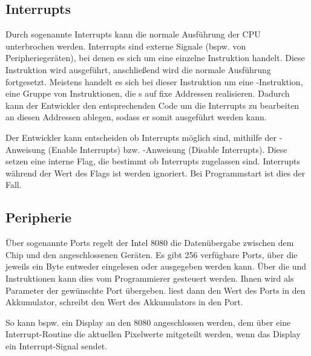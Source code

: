 \subsection{Interrupts}

Durch sogenannte Interrupts kann die normale Ausführung der CPU unterbrochen werden. Interrupts sind externe Signale (bspw. von Peripheriegeräten), bei denen es sich um eine einzelne Instruktion handelt. Diese Instruktion wird ausgeführt, anschließend wird die normale Ausführung fortgesetzt. Meistens handelt es sich bei dieser Instruktion um eine -Instruktion, eine Gruppe von Instruktionen, die s auf fixe Addressen realisieren. Dadurch kann der Entwickler den entsprechenden Code um die Interrupts zu bearbeiten an diesen Addressen ablegen, sodass er somit ausgeführt werden kann.

Der Entwickler kann entscheiden ob Interrupts möglich sind, mithilfe der -Anweisung (Enable Interrupts) bzw. -Anweisung (Disable Interrupts). Diese setzen eine interne Flag, die bestimmt ob Interrupts zugelassen sind. Interrupts während der Wert des Flags  ist werden ignoriert. Bei Programmstart ist dies der Fall.

\subsection{Peripherie}

Über sogenannte Ports regelt der Intel 8080 die Datenübergabe zwischen dem Chip und den angeschlossenen Geräten. 
Es gibt 256 verfügbare Ports, über die jeweils ein Byte entweder eingelesen oder ausgegeben werden kann. Über die  und  Instruktionen kann dies vom Programmierer gesteuert werden. Ihnen wird als Parameter der gewünschte Port übergeben.  liest dann den Wert des Ports in den Akkumulator,  schreibt den Wert des Akkumulators in den Port.

So kann bspw. ein Display an den 8080 angeschlossen werden, dem über eine Interrupt-Routine die aktuellen Pixelwerte mitgeteilt werden, wenn das Display ein Interrupt-Signal sendet.
